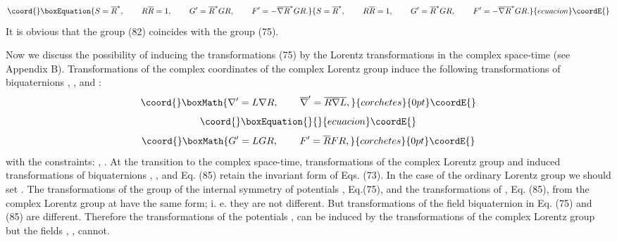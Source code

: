 \documentclass[a4paper,12pt]{article}
\begin{document}
\begin{equation}\coord{}\boxEquation{
S=\overline{R}^{*},\hspace{0.3in}R\overline{R}=1,\hspace{0.3in}G^{\prime
}=\overline{R} ^{*}GR,\hspace{0.3in}F^{\prime }=-\overline{\nabla
}\overline{R}^{*}GR. \label{84}
}{
S=\overline{R}^{*},\hspace{0.3in}R\overline{R}=1,\hspace{0.3in}G^{\prime
}=\overline{R} ^{*}GR,\hspace{0.3in}F^{\prime }=-\overline{\nabla
}\overline{R}^{*}GR. }{ecuacion}\coordE{}\end{equation}
It is obvious that the group (82) coincides with the group (75).

Now we discuss the possibility of inducing the transformations (75) by the
Lorentz transformations in the complex space-time (see Appendix B).
Transformations of the complex coordinates \coordHE{} of the complex
Lorentz group \coordHE{} induce the following transformations of
biquaternions \myHighlight{$\nabla $}\coordHE{}, \myHighlight{$\overline{\nabla }$}\coordHE{}, \coordHE{} and \coordHE{}:
\[\coord{}\boxMath{
\nabla ^{\prime }=L\nabla R,\hspace{0.3in}\overline{\nabla
}^{\prime }= \overline{R}\overline{\nabla }\overline{L},
}{corchetes}{0pt}\coordE{}\]
\vspace{-8mm}
\begin{equation}\coord{}\boxEquation{  \label{85}
}{  }{ecuacion}\coordE{}\end{equation}
\vspace{-8mm}
\[\coord{}\boxMath{
G^{\prime }=LGR,\hspace{0.3in}F^{\prime }=\overline{R}FR,
}{corchetes}{0pt}\coordE{}\]
with the constraints: \coordHE{}, \coordHE{}. At the
transition to the complex space-time, transformations of the
complex Lorentz group \coordHE{} and induced transformations of
biquaternions \myHighlight{$\nabla $}\coordHE{}, \myHighlight{$ \overline{\nabla }$}\coordHE{}, \coordHE{} and \coordHE{} Eq.
(85) retain the invariant form of Eqs. (73). In the case of the
ordinary Lorentz group \coordHE{} we should set \coordHE{}. The transformations of the group of the
internal symmetry of potentials \coordHE{}, Eq.(75), and the
transformations of \coordHE{}, Eq. (85), from the complex Lorentz group
at \coordHE{} have the same form; i. e. they are not different. But
transformations of the field biquaternion \coordHE{} in Eq. (75) and (85)
are different. Therefore the transformations of the potentials
\myHighlight{$\varphi_\mu $}\coordHE{} , \myHighlight{$\widetilde{\varphi}_\mu$}\coordHE{} can be induced by the
transformations of the complex Lorentz group \coordHE{} but the
fields \myHighlight{$\varphi _{\mu \nu }$}\coordHE{}, \myHighlight{$\varphi $}\coordHE{}, \myHighlight{$\widetilde{\varphi }$}\coordHE{}
cannot.
\end{document}

